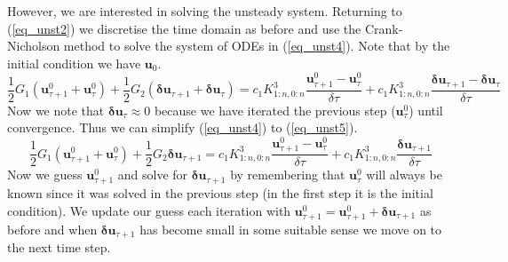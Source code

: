 \documentclass[11pt,fleqn]{article}
\theoremstyle{defstyle}
\begin{document}
However, we are interested in solving the unsteady system. Returning to (\ref{eq_unst2}) we discretise the time domain as before and use the Crank-Nicholson method to solve the system of ODEs in (\ref{eq_unst4}). Note that by the initial condition we have $\mathbf{u}_0$. 
\begin{equation}
\frac{1}{2} G_1\left(\mathbf{u}^0_{\tau+1}+\mathbf{u}^0_{\tau}\right) + \frac{1}{2}G_2\left(\mathbf{\delta u}_{\tau+1}+\mathbf{\delta u}_{\tau}\right) =c_1K^3_{1:n,0:n}\frac{\mathbf{u}^0_{\tau + 1}-\mathbf{u}^0_{\tau}}{\delta \tau} + c_1K^3_{1:n,0:n}\frac{\mathbf{\delta u}_{\tau + 1}-\mathbf{\delta u}_{\tau }}{\delta \tau}
\label{eq_unst4}
\end{equation}
Now we note that $\mathbf{\delta u}_{\tau} \approx 0$ because we have iterated the previous step ($\mathbf{u}^0_{\tau}$) until convergence. Thus we can simplify (\ref{eq_unst4}) to (\ref{eq_unst5}).
\begin{equation}
\frac{1}{2} G_1\left(\mathbf{u}^0_{\tau+1}+\mathbf{u}^0_{\tau}\right) + \frac{1}{2}G_2\mathbf{\delta u}_{\tau+1} =c_1K^3_{1:n,0:n}\frac{\mathbf{u}^0_{\tau + 1}-\mathbf{u}^0_{\tau}}{\delta \tau} + c_1K^3_{1:n,0:n}\frac{\mathbf{\delta u}_{\tau + 1}}{\delta \tau}
\label{eq_unst5}
\end{equation}
Now we guess $\mathbf{u}^0_{\tau+1}$ and solve for $\mathbf{\delta u}_{\tau+1}$ by remembering that $\mathbf{u}^0_{\tau}$ will always be known since it was solved in the previous step (in the first step it is the initial condition). We update our guess each iteration with  $\mathbf{u}^0_{\tau+1} = \mathbf{u}^0_{\tau+1} + \mathbf{\delta u}_{\tau+1}$ as before and when $\mathbf{\delta u}_{\tau+1}$ has become small in some suitable sense we move on to the next time step.
\end{document}
